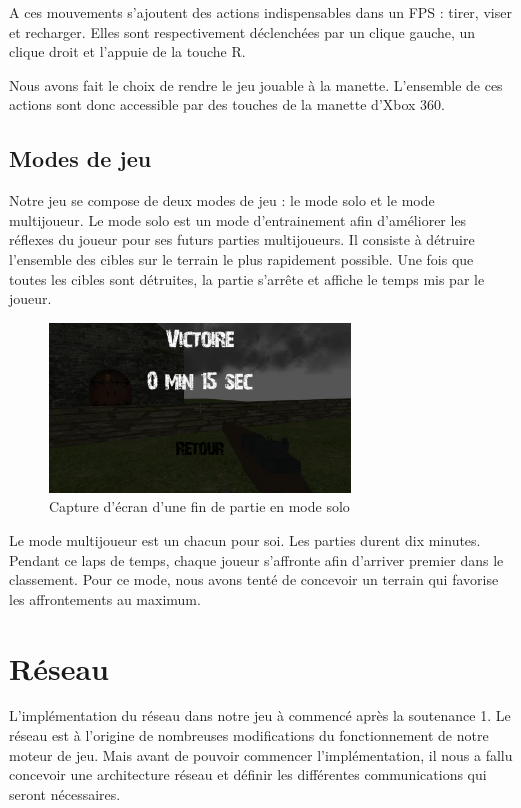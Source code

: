 \documentclass[11pt]{report}
\begin{document}
A ces mouvements s'ajoutent des actions indispensables dans un FPS : tirer, viser et recharger. Elles sont respectivement déclenchées par un clique gauche, un clique droit et l'appuie de la touche R.

Nous avons fait le choix de rendre le jeu jouable à la manette. L'ensemble de ces actions sont donc accessible par des touches de la manette d'Xbox 360.

\section{Modes de jeu}

Notre jeu se compose de deux modes de jeu : le mode solo et le mode multijoueur. Le mode solo est un mode d'entrainement afin d'améliorer les réflexes du joueur pour ses futurs parties multijoueurs. Il consiste à détruire l'ensemble des cibles sur le terrain le plus rapidement possible. Une fois que toutes les cibles sont détruites, la partie s'arrête et affiche le temps mis par le joueur.

\begin{figure}[htbp]
\centering
\includegraphics[width=8cm]{score.png}
\caption{Capture d'écran d'une fin de partie en mode solo}
\end{figure}

Le mode multijoueur est un chacun pour soi. Les parties durent dix minutes. Pendant ce laps de temps, chaque joueur s'affronte afin d'arriver premier dans le classement. Pour ce mode, nous avons tenté de concevoir un terrain qui favorise les affrontements au maximum.


\chapter{Réseau}

L'implémentation du réseau dans notre jeu à commencé après la soutenance 1. Le réseau est à l'origine de nombreuses modifications du fonctionnement de notre moteur de jeu. Mais avant de pouvoir commencer l'implémentation, il nous a fallu concevoir une architecture réseau et définir les différentes communications qui seront nécessaires.
\end{document}
